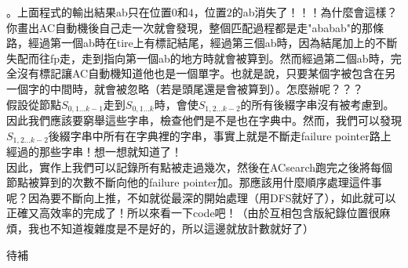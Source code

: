 。上面程式的輸出結果ab只在位置$0$和$4$，位置$2$的ab消失了！！！為什麼會這樣？你畫出AC自動機後自己走一次就會發現，整個匹配過程都是走"ababab"的那條路，經過第一個ab時在tire上有標記結尾，經過第三個ab時，因為結尾加上的不斷失配而往fp走，走到指向第一個ab的地方時就會被算到。然而經過第二個ab時，完全沒有標記讓AC自動機知道他也是一個單字。也就是說，只要某個字被包含在另一個字的中間時，就會被忽略（若是頭尾還是會被算到）。怎麼辦呢？？？\\

假設從節點$S_{0,1\dots k-1}$走到$S_{0,1\dots k}$時，會使$S_{1,2\dots k-2}$的所有後綴字串沒有被考慮到。因此我們應該要窮舉這些字串，檢查他們是不是也在字典中。然而，我們可以發現$S_{1,2\dots k-2}$後綴字串中所有在字典裡的字串，事實上就是不斷走failure pointer路上經過的那些字串！想一想就知道了！\\

因此，實作上我們可以記錄所有點被走過幾次，然後在ACsearch跑完之後將每個節點被算到的次數不斷向他的failure pointer加。那應該用什麼順序處理這件事呢？因為要不斷向上推，不如就從最深的開始處理（用DFS就好了），如此就可以正確又高效率的完成了！所以來看一下code吧！（由於互相包含版紀錄位置很麻煩，我也不知道複雜度是不是好的，所以這邊就放計數就好了）
\begin{C++}
待補
\end{C++}